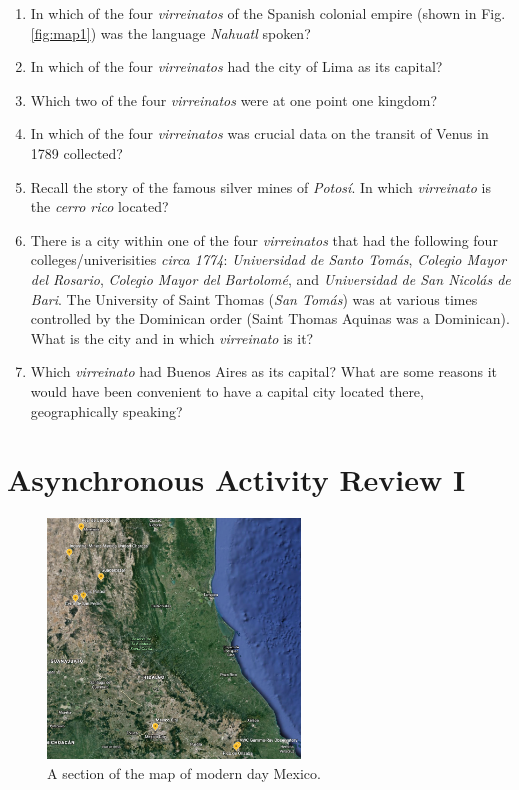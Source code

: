 \documentclass[10pt]{article}
\begin{document}
\begin{enumerate}
\item In which of the four \textit{virreinatos} of the Spanish colonial empire (shown in Fig. \ref{fig:map1}) was the language \textit{Nahuatl} spoken?
\item In which of the four \textit{virreinatos} had the city of Lima as its capital?
\item Which two of the four \textit{virreinatos} were at one point one kingdom?
\item In which of the four \textit{virreinatos} was crucial data on the transit of Venus in 1789 collected?
\item Recall the story of the famous silver mines of \textit{Potos\'{i}}.  In which \textit{virreinato} is the \textit{cerro rico} located?
\item There is a city within one of the four \textit{virreinatos} that had the following four colleges/univerisities \textit{circa 1774}: \textit{Universidad de Santo Tom\'{a}s}, \textit{Colegio Mayor del Rosario}, \textit{Colegio Mayor del Bartolom\'{e}}, and \textit{Universidad de San Nicol\'{a}s de Bari}.  The University of Saint Thomas (\textit{San Tom\'{a}s}) was at various times controlled by the Dominican order (Saint Thomas Aquinas was a Dominican).  What is the city and in which \textit{virreinato} is it?
\item Which \textit{virreinato} had Buenos Aires as its capital?  What are some reasons it would have been convenient to have a capital city located there, geographically speaking? \\
\end{enumerate}

\clearpage

\section{Asynchronous Activity Review I}

\begin{figure}
\centering
\includegraphics[width=0.6\textwidth]{figures/mines.png}
\caption{\label{fig:mines} A section of the map of modern day Mexico.}
\end{figure}
\end{document}
